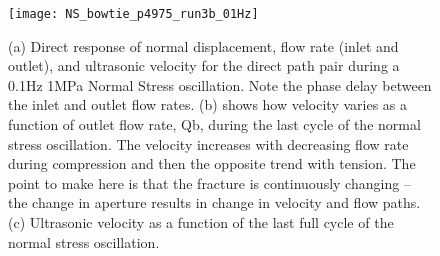 \documentclass[letterpaper,10pt]{article}
\begin{document}
%

\begin{figure}[h]
	\centering
	\texttt{[image: NS\_bowtie\_p4975\_run3b\_01Hz]}
	\caption[]{(a) Direct response of normal displacement, flow rate (inlet and outlet), and ultrasonic velocity for the direct path pair during a 0.1Hz 1MPa Normal Stress oscillation. Note the phase delay between the inlet and outlet flow rates. (b) shows how velocity varies as a function of outlet flow rate, Qb, during the last cycle of the normal stress oscillation. The velocity increases with decreasing flow rate during compression and then the opposite trend with tension. The point to make here is that the fracture is continuously changing -- the change in aperture results in change in velocity and flow paths. (c) Ultrasonic velocity as a function of the last full cycle of the normal stress oscillation.}
	\label{fig:NS_p4975_run3b_01Hz}
\end{figure}
\end{document}
